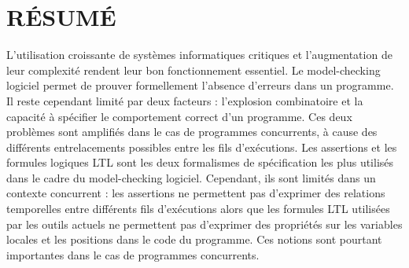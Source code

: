 %
%
\chapter*{RÉSUMÉ}\thispagestyle{headings}



L'utilisation croissante de systèmes informatiques critiques et l'augmentation
de leur complexité rendent leur bon fonctionnement essentiel. Le model-checking
logiciel permet de prouver formellement l'absence d'erreurs dans un programme.
Il reste cependant limité par deux facteurs : l'explosion combinatoire et la
capacité à spécifier le comportement correct d'un programme. Ces deux problèmes
sont amplifiés dans le cas de programmes concurrents, à cause des différents
entrelacements possibles entre les fils d'exécutions. Les assertions et les
formules logiques LTL sont les deux formalismes de spécification les plus
utilisés dans le cadre du model-checking logiciel. Cependant, ils sont limités
dans un contexte concurrent : les assertions ne permettent pas d'exprimer des
relations temporelles entre différents fils d'exécutions alors que les formules
LTL utilisées par les outils actuels ne permettent pas d'exprimer des propriétés
sur les variables locales et les positions dans le code du programme. Ces
notions sont pourtant importantes dans le cas de programmes concurrents.

